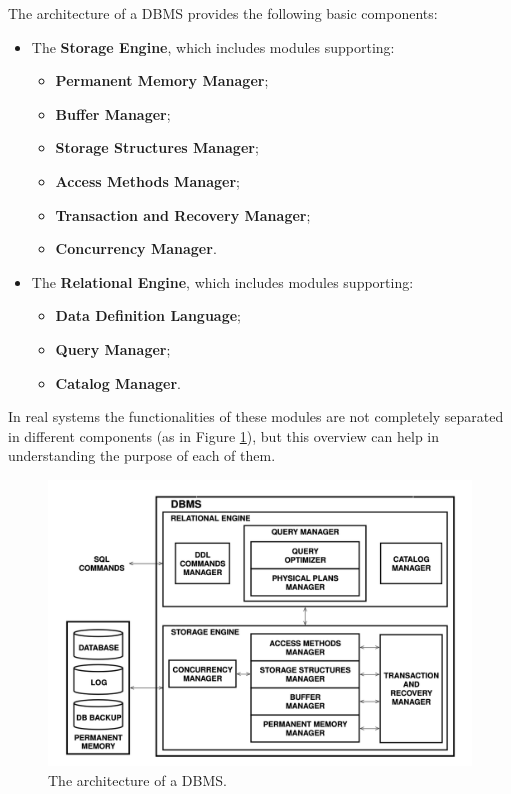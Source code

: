 The architecture of a DBMS provides the following basic components:
\begin{itemize}
    \item The \textbf{Storage Engine}, which includes modules supporting:
    \begin{itemize}
        \item \textbf{Permanent Memory Manager};
        \item \textbf{Buffer Manager};
        \item \textbf{Storage Structures Manager};
        \item \textbf{Access Methods Manager};
        \item \textbf{Transaction and Recovery Manager};
        \item \textbf{Concurrency Manager}.
    \end{itemize}

    \item The \textbf{Relational Engine}, which includes modules supporting:
    \begin{itemize}
        \item \textbf{Data Definition Language};
        \item \textbf{Query Manager};
        \item \textbf{Catalog Manager}.
    \end{itemize}
\end{itemize}
In real systems the functionalities of these modules are not completely separated in different components (as in Figure \ref{fig:DBMS_schema}), but this overview can help in understanding the purpose of each of them. 

\begin{figure}[h]
    \centering
    \includegraphics[width=0.75\linewidth]{img/DBMS schema.png}
    \caption{The architecture of a DBMS.}
    \label{fig:DBMS_schema}
\end{figure}

